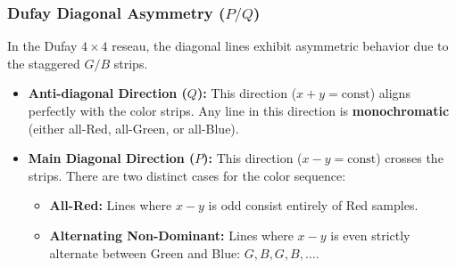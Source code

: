 \documentclass[a4paper,11pt]{article}
\newcommand{\tile}[6][]{%
  \if#4r\def\tilecol{cfared}\else
    \if#4g\def\tilecol{cfagreen}\else
      \if#4b\def\tilecol{cfablue}\else
        \def\tilecol{cfagrey}\fi\fi\fi
  \node[cfa-tile, fill=\tilecol!60, #1] (T#2#3) at (#2*0.8, -#3*0.8) {};
  \ifx&#5&\else\node[cfa-coords, above=0pt of T#2#3] {#5};\fi
  \ifx&#6&\else\node[cfa-weight] at (T#2#3) {#6};\fi
}
\begin{document}
\begin{center}
\end{center}

\subsubsection{Dufay Diagonal Asymmetry ($P/Q$)}
In the Dufay $4\times4$ reseau, the diagonal lines exhibit asymmetric behavior due to the staggered $G/B$ strips. 

\begin{itemize}
    \item \textbf{Anti-diagonal Direction ($Q$):} This direction ($x+y=\text{const}$) aligns perfectly with the color strips. Any line in this direction is \textbf{monochromatic} (either all-Red, all-Green, or all-Blue). 
    \item \textbf{Main Diagonal Direction ($P$):} This direction ($x-y=\text{const}$) crosses the strips. There are two distinct cases for the color sequence:
    \begin{itemize}
        \item \textbf{All-Red:} Lines where $x-y$ is odd consist entirely of Red samples.
        \item \textbf{Alternating Non-Dominant:} Lines where $x-y$ is even strictly alternate between Green and Blue: $G, B, G, B, \dots$.
    \end{itemize}
\end{itemize}
\end{document}
